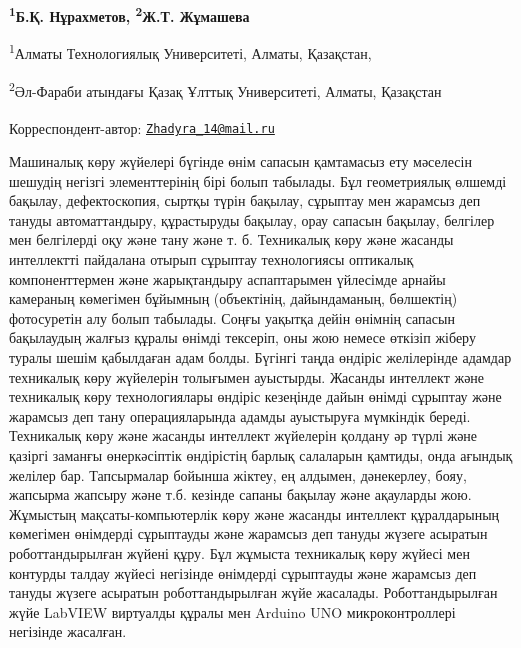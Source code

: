 
\begin{articleheader}

{\bfseries
\textsuperscript{1}Б.Қ. Нұрахметов,
\textsuperscript{2}Ж.Т. Жұмашева\textsuperscript{\envelope }
}
\end{articleheader}

\begin{affiliation}
\textsuperscript{1}Алматы Технологиялық Университеті, Алматы, Қазақстан,

\textsuperscript{2}Әл-Фараби атындағы Қазақ Ұлттық Университеті, Алматы, Қазақстан

\raggedright \textsuperscript{\envelope }Корреспондент-автор: \href{mailto:Zhadyra_14@mail.ru}{\nolinkurl{Zhadyra\_14@mail.ru}}
\end{affiliation}

Машиналық көру жүйелері бүгінде өнім сапасын қамтамасыз ету мәселесін
шешудің негізгі элементтерінің бірі болып табылады. Бұл геометриялық
өлшемді бақылау, дефектоскопия, сыртқы түрін бақылау, сұрыптау мен
жарамсыз деп тануды автоматтандыру, құрастыруды бақылау, орау сапасын
бақылау, белгілер мен белгілерді оқу және тану және т. б. Техникалық
көру және жасанды интеллектті пайдалана отырып сұрыптау технологиясы
оптикалық компоненттермен және жарықтандыру аспаптарымен үйлесімде
арнайы камераның көмегімен бұйымның (объектінің, дайындаманың,
бөлшектің) фотосуретін алу болып табылады. Соңғы уақытқа дейін өнімнің
сапасын бақылаудың жалғыз құралы өнімді тексеріп, оны жою немесе өткізіп
жіберу туралы шешім қабылдаған адам болды. Бүгінгі таңда өндіріс
желілерінде адамдар техникалық көру жүйелерін толығымен ауыстырды.
Жасанды интеллект және техникалық көру технологиялары өндіріс кезеңінде
дайын өнімді сұрыптау және жарамсыз деп тану операцияларында адамды
ауыстыруға мүмкіндік береді. Техникалық көру және жасанды интеллект
жүйелерін қолдану әр түрлі және қазіргі заманғы өнеркәсіптік өндірістің
барлық салаларын қамтиды, онда ағындық желілер бар. Тапсырмалар бойынша
жіктеу, ең алдымен, дәнекерлеу, бояу, жапсырма жапсыру және т.б. кезінде
сапаны бақылау және ақауларды жою. Жұмыстың мақсаты-компьютерлік көру
және жасанды интеллект құралдарының көмегімен өнімдерді сұрыптауды және
жарамсыз деп тануды жүзеге асыратын роботтандырылған жүйені құру. Бұл
жұмыста техникалық көру жүйесі мен контурды талдау жүйесі негізінде
өнімдерді сұрыптауды және жарамсыз деп тануды жүзеге асыратын
роботтандырылған жүйе жасалады. Роботтандырылған жүйе LabVIEW виртуалды
құралы мен Arduino UNO микроконтроллері негізінде жасалған.

